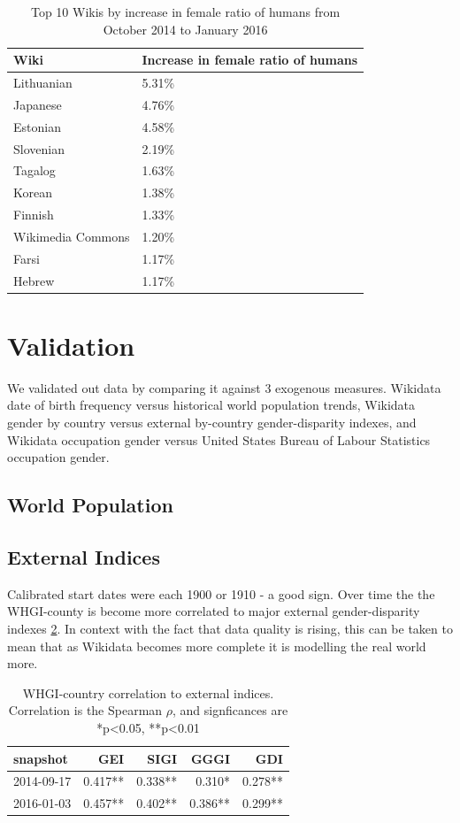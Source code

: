 \documentclass{sigchi-ext}
\begin{document}
\begin{table}
\caption{Top 10 Wikis by increase in female ratio of humans from October 2014 to January 2016}
\label{table:top10}
\begin{tabular}{p{2cm}p{2cm}}
\toprule
{Wiki} &     Increase in female ratio of humans  \\
\midrule
Lithuanian      & 5.31\% \\
Japanese     & 4.76\% \\
Estonian      & 4.58\% \\
Slovenian      & 2.19\% \\
Tagalog      & 1.63\% \\
Korean      & 1.38\% \\
Finnish      & 1.33\% \\
Wikimedia Commons & 1.20\% \\
Farsi      & 1.17\% \\
Hebrew      & 1.17\% \\
\bottomrule
\end{tabular}


\end{table}

\section{Validation}
We validated out data by comparing it against 3 exogenous measures. Wikidata date of birth frequency versus historical world population trends, Wikidata gender by country  versus external by-country gender-disparity indexes, and Wikidata occupation gender versus United States Bureau of Labour Statistics occupation gender.

\subsection{World Population}

\subsection{External Indices}
Calibrated start dates were each 1900 or 1910 - a good sign. Over time the the WHGI-county is become more correlated to major external gender-disparity indexes \ref{table:scores}. In context with the fact that data quality is rising, this can be taken to mean that as Wikidata becomes more complete it is modelling the real world more. 

 \begin{table}
\caption{WHGI-country correlation to external indices. Correlation is the Spearman $\rho$, and signficances are *p<0.05, **p<0.01}
\label{table:scores}
\begin{tabular}{lrrrr}
\toprule
snapshot &  GEI &  SIGI &  GGGI &  GDI  \\
\midrule
2014-09-17 &  0.417** &       0.338** &          0.310* &         0.278**  \\
2016-01-03 &  0.457** &       0.402** &          0.386** &         0.299**  \\
\bottomrule
\end{tabular}
\end{table}
\end{document}

